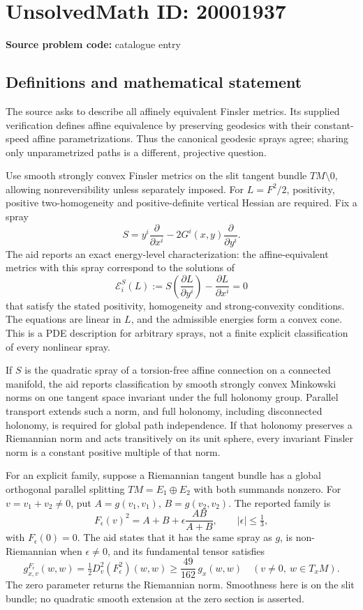 \documentclass[11pt]{article}
\begin{document}
\section*{UnsolvedMath ID: 20001937}
\textbf{Source problem code:} catalogue entry
\subsection{Definitions and mathematical statement}
The source asks to describe all affinely equivalent Finsler metrics. Its supplied verification defines affine equivalence by preserving geodesics with their constant-speed affine parametrizations. Thus the canonical geodesic sprays agree; sharing only unparametrized paths is a different, projective question.

Use smooth strongly convex Finsler metrics on the slit tangent bundle \(TM\setminus0\), allowing nonreversibility unless separately imposed. For \(L=F^2/2\), positivity, positive two-homogeneity and positive-definite vertical Hessian are required. Fix a spray
\[
 S=y^i\frac{\partial}{\partial x^i}-2G^i(x,y)\frac{\partial}{\partial y^i}.
\]
The aid reports an exact energy-level characterization: the affine-equivalent metrics with this spray correspond to the solutions of
\[
 \mathcal E_i^S(L):=
 S\left(\frac{\partial L}{\partial y^i}\right)
 -\frac{\partial L}{\partial x^i}=0
\]
that satisfy the stated positivity, homogeneity and strong-convexity conditions. The equations are linear in \(L\), and the admissible energies form a convex cone. This is a PDE description for arbitrary sprays, not a finite explicit classification of every nonlinear spray.

If \(S\) is the quadratic spray of a torsion-free affine connection on a connected manifold, the aid reports classification by smooth strongly convex Minkowski norms on one tangent space invariant under the full holonomy group. Parallel transport extends such a norm, and full holonomy, including disconnected holonomy, is required for global path independence. If that holonomy preserves a Riemannian norm and acts transitively on its unit sphere, every invariant Finsler norm is a constant positive multiple of that norm.

For an explicit family, suppose a Riemannian tangent bundle has a global orthogonal parallel splitting \(TM=E_1\oplus E_2\) with both summands nonzero. For \(v=v_1+v_2\ne0\), put \(A=g(v_1,v_1)\), \(B=g(v_2,v_2)\). The reported family is
\[
 F_\epsilon(v)^2=A+B+\epsilon\frac{AB}{A+B},\qquad
 |\epsilon|\leq\tfrac13,
\]
with \(F_\epsilon(0)=0\). The aid states that it has the same spray as \(g\), is non-Riemannian when \(\epsilon\ne0\), and its fundamental tensor satisfies
\[
 g^{F_\epsilon}_{x,v}(w,w)
 =\tfrac12D_v^2(F_\epsilon^2)(w,w)
 \geq\frac{49}{162}\,g_x(w,w)
 \quad(v\ne0,\ w\in T_xM).
\]
The zero parameter returns the Riemannian norm. Smoothness here is on the slit bundle; no quadratic smooth extension at the zero section is asserted.
\end{document}
